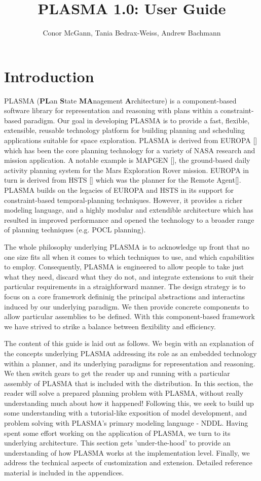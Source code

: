 \documentclass[10pt, letterpaper, twoside]{article}
\author{Conor McGann, Tania Bedrax-Weiss, Andrew Bachmann}
\title{PLASMA 1.0: User Guide}
\begin{document}
\maketitle

\section{Introduction}
PLASMA ({\bf PL}an {\bf S}tate {\bf MA}nagement {\bf A}rchitecture) is a component-based software library for representation and reasoning with plans within a constraint-based paradigm. Our goal in developing PLASMA is to provide a fast, flexible, extensible, reusable technology platform for building planning and scheduling applications suitable for space exploration. PLASMA is derived from EUROPA [] which has been the core planning technology for a variety of NASA research and mission application. A notable example is  MAPGEN [], the ground-based daily activity planning system for the Mars Exploration Rover mission. EUROPA in turn is derived from HSTS [] which was the planner for the Remote Agent[]. PLASMA builds on the legacies of EUROPA and HSTS in its support for constraint-based temporal-planning techniques. However, it provides a richer modeling language, and a highly modular and extendible architecture which has resulted in improved performance and opened the technology to a broader range of planning techniques (e.g. POCL planning). 

The whole philosophy underlying PLASMA is to acknowledge up front that no one size fits all when it comes to which techniques to use, and which capabilities to employ. Consequently, PLASMA is engineered to allow people to take just what they need, discard what they do not, and integrate extensions to suit their particular requirements in a straighforward manner. The design strategy is to focus on a core framework defininig the principal abstractions and interactins induced by our underlying paradigm. We then provide concrete components to allow particular assemblies to be defined. With this component-based framework we have strived to strike a balance between flexibility and efficiency.

The content of this guide is laid out as follows. We begin with an explanation of the concepts underlying PLASMA addressing its role as an embedded technology within a planner, and its underlying paradigms for representation and reasoning. We then switch gears to get the reader up and running with a particular assembly of PLASMA that is included with the distribution. In this section, the reader will solve a prepared planning problem with PLASMA, without really understanding much about how it happened! Following this, we seek to build up some understanding with a tutorial-like exposition of model development, and problem solving with PLASMA's primary modeling language - NDDL. Having spent some effort working on the application of PLASMA, we turn to its underlying architecture. This section gets 'under-the-hood' to provide an understanding of how PLASMA works at the implementation level.  Finally, we address the technical aspects of customization and extension. Detailed reference material is included in the appendices.
\end{document}
